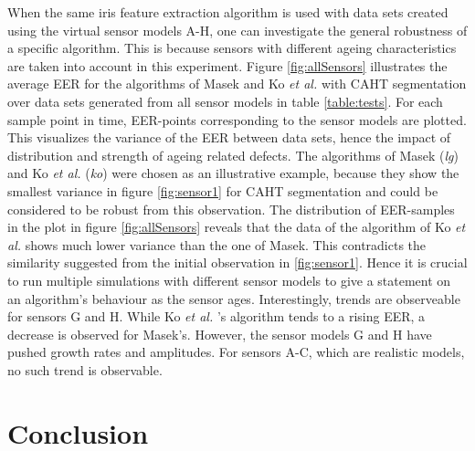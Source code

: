 \documentclass[10pt,twocolumn,letterpaper]{article}
\providecommand{\etal}[0]{\textit{et al.} }
\begin{document}
 When the same iris feature extraction algorithm is used with data sets created using the virtual sensor models A-H, one can investigate the general robustness of a specific algorithm. This is because sensors with different ageing characteristics are taken into account in this experiment. Figure \ref{fig:allSensors} illustrates the average EER for the algorithms of Masek and Ko \etal with CAHT segmentation over data sets generated from all sensor models in table \ref{table:tests}. For each sample point in time, EER-points corresponding to the sensor models are plotted. This visualizes the variance of the EER between data sets, hence the impact of distribution and strength of ageing related defects. The algorithms of Masek (\emph{lg}) and Ko \etal (\emph{ko}) were chosen as an illustrative example, because they show the smallest variance in figure \ref{fig:sensor1} for CAHT segmentation and could be considered to be robust from this observation. The distribution of EER-samples in the plot in figure \ref{fig:allSensors} reveals that the data of the algorithm of Ko \etal shows much lower variance than the one of Masek. This contradicts the similarity suggested from the initial observation in \ref{fig:sensor1}. Hence it is crucial to run multiple simulations with different sensor models to give a statement on an algorithm's behaviour as the sensor ages. Interestingly, trends are observeable for sensors G and H. While Ko \etal's algorithm tends to a rising EER, a decrease is observed for Masek's. However, the sensor models G and H have pushed growth rates and amplitudes. For sensors A-C, which are realistic models, no such trend is observable.
 
 \section{Conclusion}
 \label{conclusion}
 
\end{document}
